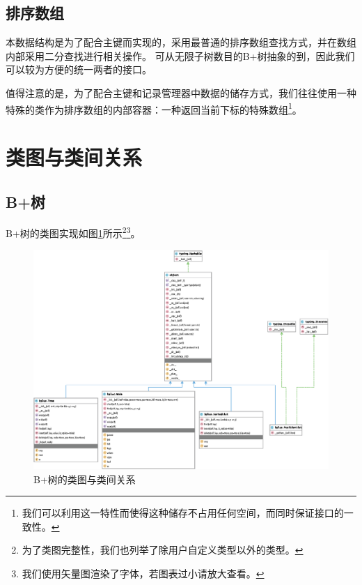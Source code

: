 \documentclass[UTF8]{ctexrep} %
\begin{document}
\subsection{排序数组}
本数据结构是为了配合主键而实现的，采用最普通的排序数组查找方式，并在数组内部采用二分查找进行相关操作。
可从无限子树数目的B+树抽象的到，因此我们可以较为方便的统一两者的接口。
\par
值得注意的是，为了配合主键和记录管理器中数据的储存方式，我们往往使用一种特殊的类作为排序数组的内部容器：一种返回当前下标的特殊数组\footnote{我们可以利用这一特性而使得这种储存不占用任何空间，而同时保证接口的一致性。}。

\section{类图与类间关系}
\subsection{B+树}
B+树的类图实现如图\ref{fig:bplus_diagram}所示\footnote{为了类图完整性，我们也列举了除用户自定义类型以外的类型。}\footnote{我们使用矢量图渲染了字体，若图表过小请放大查看。}。
\begin{figure}[H]
    \centering
    \includegraphics[width=\linewidth]{figure/bplus.eps}
    \caption{B+树的类图与类间关系}
    \label{fig:bplus_diagram}
\end{figure}
\end{document}
